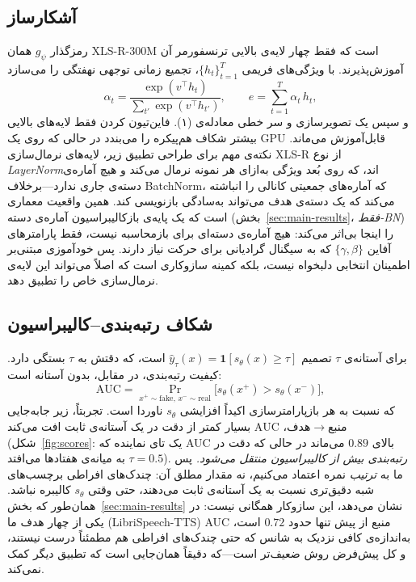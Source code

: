 \documentclass[a4paper,11pt]{article}
\begin{document}
\subsection{آشکارساز}
رمزگذار $g_\psi$ همان XLS-R-300M است که فقط چهار لایه‌ی بالایی ترنسفورمر
آن آموزش‌پذیرند. با ویژگی‌های فریمی $\{h_t\}_{t=1}^{T}$، تجمیع زمانی
توجهی نهفتگی را می‌سازد
\begin{equation}
\alpha_t=\frac{\exp(v^\top h_t)}{\sum_{t'}\exp(v^\top h_{t'})},\qquad
e=\sum_{t=1}^{T}\alpha_t\,h_t,
\end{equation}
و سپس یک تصویرسازی و سر خطی معادله‌ی (۱). فاین‌تیون کردن فقط لایه‌های
بالایی بیشتر شکاف هم‌پیکره را می‌بندد در حالی که روی یک GPU قابل‌آموزش
می‌ماند. نکته‌ی مهم برای طراحی تطبیق زیر، لایه‌های نرمال‌سازی XLS-R از نوع
\emph{LayerNorm}‌اند، که روی بُعد ویژگی به‌ازای هر نمونه نرمال می‌کند و
هیچ آماره‌ی دسته‌ی جاری ندارد---برخلاف BatchNorm، که آماره‌های جمعیتی
کانالی را انباشته می‌کند که یک دسته‌ی هدف می‌تواند به‌سادگی بازنویسی کند.
همین واقعیت معماری است که یک پایه‌ی بازکالیبراسیون آماره‌ی دسته
(بخش~\ref{sec:main-results}، \emph{فقط-BN}) را اینجا بی‌اثر می‌کند: هیچ
آماره‌ی دسته‌ای برای بازمحاسبه نیست، فقط پارامترهای آفاین $\{\gamma,\beta\}$
که به سیگنال گرادیانی برای حرکت نیاز دارند. پس خودآموزی مبتنی‌بر اطمینان
انتخابی دلبخواه نیست، بلکه کمینه سازوکاری است که اصلاً می‌تواند این لایه‌ی
نرمال‌سازی خاص را تطبیق دهد.

\subsection{شکاف رتبه‌بندی--کالیبراسیون}
برای آستانه‌ی $\tau$ تصمیم $\hat y_\tau(x)=\mathbf{1}[s_\theta(x)\ge\tau]$
است، که دقتش به $\tau$ بستگی دارد. کیفیت رتبه‌بندی، در مقابل، بدون آستانه
است:
\begin{equation}
\mathrm{AUC}=\Pr_{x^{+}\sim\mathrm{fake},\,x^{-}\sim\mathrm{real}}\!\big[s_\theta(x^{+})>s_\theta(x^{-})\big],
\end{equation}
که نسبت به هر بازپارامترسازی اکیداً افزایشی $s_\theta$ ناوردا است. تجربتاً،
زیر جابه‌جایی منبع$\rightarrow$هدف، $\mathrm{AUC}$ بسیار کمتر از دقت در یک
آستانه‌ی ثابت افت می‌کند (شکل~\ref{fig:scores}: یک تای نماینده که AUC بالای
$0.89$ می‌ماند در حالی که دقت در $\tau{=}0.5$ به میانه‌ی هفتادها می‌افتد).
\emph{رتبه‌بندی بیش از کالیبراسیون منتقل می‌شود.} پس ما به \emph{ترتیب}
نمره اعتماد می‌کنیم، نه مقدار مطلق آن: چندک‌های افراطی برچسب‌های شبه
دقیق‌تری نسبت به یک آستانه‌ی ثابت می‌دهند، حتی وقتی $s_\theta$ کالیبره
نباشد. همان‌طور که بخش~\ref{sec:main-results} نشان می‌دهد، این سازوکار
همگانی نیست: در یکی از چهار هدف ما (LibriSpeech-TTS) AUC منبع از پیش تنها
حدود $0.72$ است، به‌اندازه‌ی کافی نزدیک به شانس که حتی چندک‌های افراطی هم
مطمئناً درست نیستند، و کل پیش‌فرض روش ضعیف‌تر است---که دقیقاً همان‌جایی است
که تطبیق دیگر کمک نمی‌کند.
\end{document}

